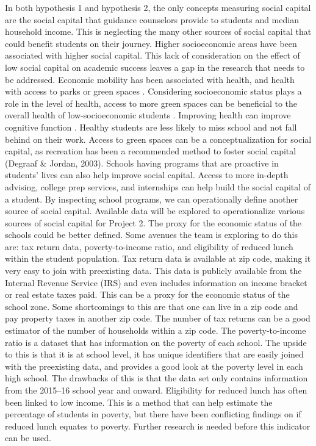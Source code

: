 In both hypothesis 1 and hypothesis 2, the only concepts measuring social capital are the social capital that guidance counselors provide to students and median household income. This is neglecting the many other sources of social capital that could benefit students on their journey. 
Higher socioeconomic areas have been associated with higher social capital. This lack of consideration on the effect of low social capital on academic success leaves a gap in the research that needs to be addressed. 
Economic mobility has been associated with health, and health with access to parks or green spaces \parencite{browning}. 
Considering socioeconomic status plays a role in the level of health, access to more green spaces can be beneficial to the overall health of low-socioeconomic students \parencite{browning}. 
Improving health can improve cognitive function \parencite{browning}. 
Healthy students are less likely to miss school and not fall behind on their work. 
Access to green spaces can be a conceptualization for social capital, as recreation has been a recommended method to foster social capital (Degraaf \& Jordan, 2003).
Schools having programs that are proactive in students' lives can also help improve social capital. 
Access to more in-depth advising, college prep services, and internships can help build the social capital of a student. 
By inspecting school programs, we can operationally define another source of social capital. 
Available data will be explored to operationalize various sources of social capital for Project 2.
The proxy for the economic status of the schools could be better defined. Some avenues the team is exploring to do this are: tax return data, poverty-to-income ratio, and eligibility of reduced lunch within the student population. 
Tax return data is available at zip code, making it very easy to join with preexisting data. This data is publicly available from the Internal Revenue Service (IRS) and even includes information on income bracket or real estate taxes paid. 
This can be a proxy for the economic status of the school zone. Some shortcomings to this are that one can live in a zip code and pay property taxes in another zip code. 
The number of tax returns can be a good estimator of the number of households within a zip code. The poverty-to-income ratio is a dataset that has information on the poverty of each school. 
The upside to this is that it is at school level, it has unique identifiers that are easily joined with the preexisting data, and provides a good look at the poverty level in each high school. 
The drawbacks of this is that the data set only contains information from the 2015--16 school year and onward. 
Eligibility for reduced lunch has often been linked to low income. This is a method that can help estimate the percentage of students in poverty, but there have been conflicting findings on if reduced lunch equates to poverty. 
Further research is needed before this indicator can be used. 

